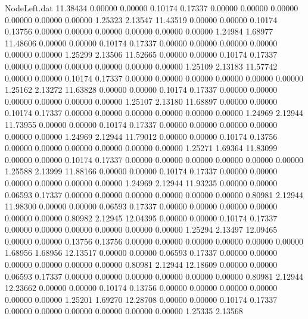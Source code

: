\begin{filecontents}{NodeLeft.dat}
  11.38434    0.00000    0.00000     0.10174    0.17337    0.00000    0.00000    0.00000    0.00000    0.00000    0.00000    1.25323    2.13547
  11.43519    0.00000    0.00000     0.10174    0.13756    0.00000    0.00000    0.00000    0.00000    0.00000    0.00000    1.24984    1.68977
  11.48606    0.00000    0.00000     0.10174    0.17337    0.00000    0.00000    0.00000    0.00000    0.00000    0.00000    1.25299    2.13506
  11.52665    0.00000    0.00000     0.10174    0.17337    0.00000    0.00000    0.00000    0.00000    0.00000    0.00000    1.25109    2.13183
  11.57742    0.00000    0.00000     0.10174    0.17337    0.00000    0.00000    0.00000    0.00000    0.00000    0.00000    1.25162    2.13272
  11.63828    0.00000    0.00000     0.10174    0.17337    0.00000    0.00000    0.00000    0.00000    0.00000    0.00000    1.25107    2.13180
  11.68897    0.00000    0.00000     0.10174    0.17337    0.00000    0.00000    0.00000    0.00000    0.00000    0.00000    1.24969    2.12944
  11.73955    0.00000    0.00000     0.10174    0.17337    0.00000    0.00000    0.00000    0.00000    0.00000    0.00000    1.24969    2.12944
  11.79012    0.00000    0.00000     0.10174    0.13756    0.00000    0.00000    0.00000    0.00000    0.00000    0.00000    1.25271    1.69364
  11.83099    0.00000    0.00000     0.10174    0.17337    0.00000    0.00000    0.00000    0.00000    0.00000    0.00000    1.25588    2.13999
  11.88166    0.00000    0.00000     0.10174    0.17337    0.00000    0.00000    0.00000    0.00000    0.00000    0.00000    1.24969    2.12944
  11.93235    0.00000    0.00000     0.06593    0.17337    0.00000    0.00000    0.00000    0.00000    0.00000    0.00000    0.80981    2.12944
  11.98300    0.00000    0.00000     0.06593    0.17337    0.00000    0.00000    0.00000    0.00000    0.00000    0.00000    0.80982    2.12945
  12.04395    0.00000    0.00000     0.10174    0.17337    0.00000    0.00000    0.00000    0.00000    0.00000    0.00000    1.25294    2.13497
  12.09465    0.00000    0.00000     0.13756    0.13756    0.00000    0.00000    0.00000    0.00000    0.00000    0.00000    1.68956    1.68956
  12.13517    0.00000    0.00000     0.06593    0.17337    0.00000    0.00000    0.00000    0.00000    0.00000    0.00000    0.80981    2.12944
  12.18609    0.00000    0.00000     0.06593    0.17337    0.00000    0.00000    0.00000    0.00000    0.00000    0.00000    0.80981    2.12944
  12.23662    0.00000    0.00000     0.10174    0.13756    0.00000    0.00000    0.00000    0.00000    0.00000    0.00000    1.25201    1.69270
  12.28708    0.00000    0.00000     0.10174    0.17337    0.00000    0.00000    0.00000    0.00000    0.00000    0.00000    1.25335    2.13568

\end{filecontents}
